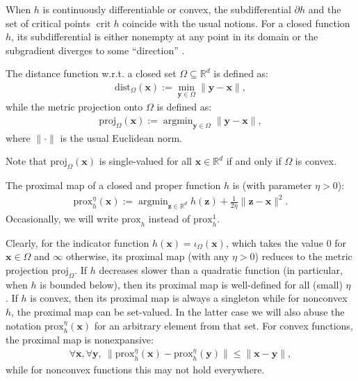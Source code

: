 \documentclass[leqno,onefignum,onetabnum]{siamart0516}
\newcommand{\eg}{{e.g.}\xspace}
\newcommand{\wrt}{{w.r.t.}\xspace}
\newcommand{\xb}{\mathbf{x}}
\newcommand{\yb}{\mathbf{y}}
\newcommand{\zb}{\mathbf{z}}
\newcommand{\RR}{\mathds{R}}
\newcommand{\dist}{\mathrm{dist}}
\newcommand{\prox}[2][\eta]{\mathrm{prox}_{#2}^{#1}}
\newcommand{\proj}[1]{\mathrm{proj}_{#1}}
\newcommand{\crit}{\mathop{\mathrm{crit}}}
\newcommand{\argmin}{\mathop{\mathrm{argmin}}}
\begin{document}
When $h$ is continuously differentiable or convex, the subdifferential $\partial h$ and the set of critical points $\crit h$ coincide with the usual notions. For a closed function $h$, its subdifferential is either nonempty at any point in its domain or the subgradient diverges to some ``direction'' \cite[Corollary 8.10]{vari_ana}.
\begin{definition}\label{def: distance}
The distance function \wrt a closed set $\Omega \subseteq \RR^d$ is defined as:
\begin{align}
\dist_{\Omega}(\xb) := \min_{\yb\in\Omega} \|\yb-\xb\|,  
\end{align}
while the metric projection onto $\Omega$ is defined  as:
\begin{align}
\proj{\Omega}(\xb) := \argmin_{\yb\in\Omega} \|\yb-\xb\|,
\end{align}
where $\|\cdot\|$ is the usual Euclidean norm.
\end{definition}

Note that $\proj{\Omega}(\xb)$ is single-valued for all $\xb\in\RR^d$ if and only if $\Omega$ is convex.

\begin{definition}[Proximal map, \eg \cite{vari_ana}]\label{def:prox_map}
The proximal map of a closed and proper function $h$ is (with parameter $\eta > 0$):
\begin{align}
\prox{h}(\xb) := \argmin_{\zb\in \RR^d} h(\zb) + \tfrac{1}{2\eta}\|\zb - \xb\|^2.
\end{align}
Occasionally, we will write $\prox[]{h}$ instead of $\prox[1]{h}$.
\end{definition}

Clearly, for the indicator function
$
h(\xb) = \iota_\Omega(\xb)$, which takes the value 0 for $\xb\in \Omega$ and $\infty$ otherwise, 
its proximal map (with any $\eta > 0$) reduces to the metric projection $\proj{\Omega}$. 
If $h$ decreases slower than a quadratic function (in particular, when $h$ is bounded below), then its proximal map is well-defined for all (small) $\eta$ \cite{vari_ana}. If $h$ is convex, then its proximal map is always a singleton while for nonconvex $h$, the proximal map can be set-valued. In the latter case we will also abuse the notation $\prox{h}(\xb)$ for an arbitrary element from that set. For convex functions, the proximal map is nonexpansive:
\begin{align}
\label{eq:ne}
\forall \xb, \forall \yb, ~ \|\prox{h}(\xb) - \prox{h}(\yb) \| \leq \|\xb - \yb\|,
\end{align}
while for nonconvex functions this may not hold everywhere.
\end{document}

